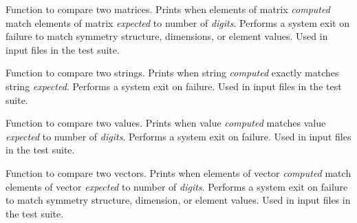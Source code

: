 \documentclass[letterpaper,10pt,english]{sphinxmanual}
\begin{document}
\begin{fulllineitems}
\label{index:util.compare_matrices}
Function to compare two matrices. Prints {\hyperref[index:util.success]{}}
when elements of matrix \emph{computed} match elements of matrix \emph{expected} to
number of \emph{digits}. Performs a system exit on failure to match symmetry
structure, dimensions, or element values. Used in input files in the test suite.

\end{fulllineitems}


\begin{fulllineitems}
\label{index:util.compare_strings}
Function to compare two strings. Prints {\hyperref[index:util.success]{}}
when string \emph{computed} exactly matches string \emph{expected}.
Performs a system exit on failure. Used in input files in the test suite.

\end{fulllineitems}


\begin{fulllineitems}
\label{index:util.compare_values}
Function to compare two values. Prints {\hyperref[index:util.success]{}}
when value \emph{computed} matches value \emph{expected} to number of \emph{digits}.
Performs a system exit on failure. Used in input files in the test suite.

\end{fulllineitems}


\begin{fulllineitems}
\label{index:util.compare_vectors}
Function to compare two vectors. Prints {\hyperref[index:util.success]{}}
when elements of vector \emph{computed} match elements of vector \emph{expected} to
number of \emph{digits}. Performs a system exit on failure to match symmetry
structure, dimension, or element values. Used in input files in the test suite.

\end{fulllineitems}
\end{document}
